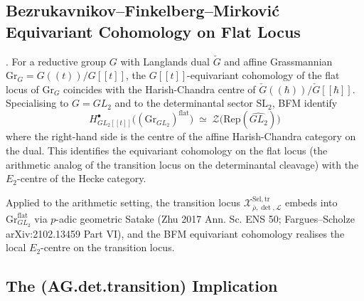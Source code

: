 \subsection{Bezrukavnikov--Finkelberg--Mirkovi\'c Equivariant Cohomology on Flat Locus}

\begin{theorem}
\label{v4-arith:w6-g:thm:bfm-equivariant}
\ClaimStatusConjectured. For a reductive group \(G\) with
Langlands dual \(\check G\) and affine Grassmannian
\(\mathrm{Gr}_{G}=G((t))/G[[t]]\), the \(G[[t]]\)-equivariant
cohomology of the flat locus of \(\mathrm{Gr}_{G}\) coincides with the
Harish-Chandra centre of \(\check G((\hbar))/\check G[[\hbar]]\).
Specialising to \(G=GL_{2}\) and to the determinantal sector
\(\mathrm{SL}_{2}\), BFM identify
\begin{equation}
\label{v4-arith:w6-g:eq:bfm-centre}
H^{\bullet}_{GL_{2}[[t]]}\bigl((\mathrm{Gr}_{GL_{2}})^{\mathrm{flat}}\bigr)\;\simeq\;\mathcal{Z}\bigl(\mathrm{Rep}(\widehat{GL_{2}})\bigr)
\end{equation}
where the right-hand side is the centre of the affine
Harish-Chandra category on the dual. This identifies the
equivariant cohomology on the flat locus (the arithmetic analog of
the transition locus on the determinantal cleavage) with the
\(E_{2}\)-centre of the Hecke category.

Applied to the arithmetic setting, the transition locus
\(\mathcal{X}^{\mathrm{Sel},\mathrm{tr}}_{\bar\rho,\det,\mathcal{L}}\)
embeds into \(\mathrm{Gr}_{GL_{2}}^{\mathrm{flat}}\) via
\(p\)-adic geometric Satake (Zhu 2017 Ann. Sc. ENS 50; Fargues--Scholze
arXiv:2102.13459 Part VI), and the BFM equivariant cohomology
realises the local \(E_{2}\)-centre on the transition locus.
\end{theorem}

\subsection{The (AG.det.transition) Implication}

